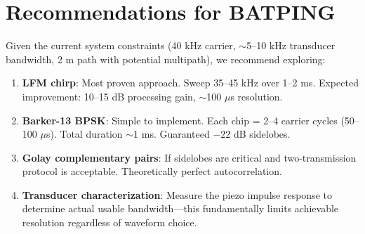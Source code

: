 \documentclass[11pt]{article}
\begin{document}
\section{Recommendations for BATPING}

Given the current system constraints (40 kHz carrier, $\sim$5--10 kHz transducer bandwidth, 2 m path with potential multipath), we recommend exploring:

\begin{enumerate}
    \item \textbf{LFM chirp}: Most proven approach. Sweep 35--45 kHz over 1--2 ms. Expected improvement: 10--15 dB processing gain, $\sim$100 $\mu$s resolution.

    \item \textbf{Barker-13 BPSK}: Simple to implement. Each chip = 2--4 carrier cycles (50--100 $\mu$s). Total duration $\sim$1 ms. Guaranteed $-22$ dB sidelobes.

    \item \textbf{Golay complementary pairs}: If sidelobes are critical and two-transmission protocol is acceptable. Theoretically perfect autocorrelation.

    \item \textbf{Transducer characterization}: Measure the piezo impulse response to determine actual usable bandwidth---this fundamentally limits achievable resolution regardless of waveform choice.
\end{enumerate}
\end{document}
